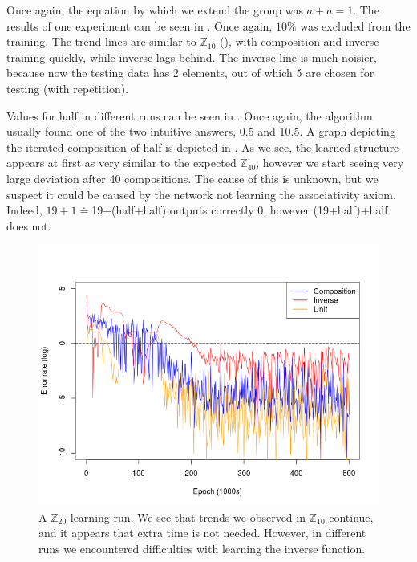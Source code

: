 Once again, the equation by which we extend the group was $a+a=1$. The results of one experiment can be seen in . Once again, $10\%$ was excluded from the training. The trend lines are similar to $\mathbb{Z}_{10}$ (), with composition and inverse training quickly, while inverse lags behind. The inverse line is much noisier, because now the testing data has 2 elements, out of which 5 are chosen for testing (with repetition).

Values for half in different runs can be seen in . Once again, the algorithm usually found one of the two intuitive answers, 0.5 and 10.5. A graph depicting the iterated composition of half is depicted in . As we see, the learned structure appears at first as very similar to the expected $\mathbb{Z}_{40}$, however we start seeing very large deviation after 40 compositions. The cause of this is unknown, but we suspect it could be caused by the network not learning the associativity axiom. Indeed, $19+1\doteq$19+(half+half) outputs correctly $0$, however (19+half)+half does not.

\begin{figure}[h]
\centering
\caption{A $\mathbb{Z}_{20}$ learning run. We see that trends we observed in $\mathbb{Z}_{10}$ continue, and it appears that extra time is not needed. However, in different runs we encountered difficulties with learning the inverse function.}
\label{graph:z20_90percent}
\includegraphics[width=\linewidth]{../img/z20_90percent.png}
\end{figure}

